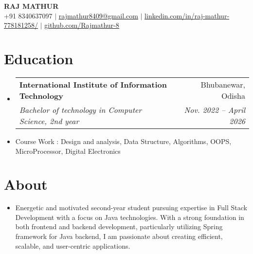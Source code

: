 \documentclass[letterpaper,11pt]{article}
\makeatletter
\newcommand{\resumeItem}[1]{
  \item\small{
    {#1 \vspace{-2pt}}
  }
}
\newcommand{\resumeSubheading}[4]{
  \vspace{-2pt}\item
    \begin{tabular*}{0.97\textwidth}[t]{l@{\extracolsep{\fill}}r}
      \textbf{#1} & #2 \\
      \textit{\small#3} & \textit{\small #4} \\
    \end{tabular*}\vspace{-7pt}
}
\newcommand{\resumeSubHeadingListStart}{\begin{itemize}[leftmargin=0.15in, label={}]}
\newcommand{\resumeSubHeadingListEnd}{\end{itemize}}
\makeatother
\begin{document}

\begin{center}
    \textbf{\Huge \scshape RAJ MATHUR} \\ \vspace{1pt}
    \small +91 8340637097 $|$ \href{mailto:x@x.com}{\underline{rajmathur8409@gmail.com}} $|$ 
    \href{https://linkedin.com/in/...}{\underline{linkedin.com/in/raj-mathur-778181258/}} $|$
    \href{https://github.com/...}{\underline{github.com/Rajmathur-8}}
\end{center}


\section{Education}
  \resumeSubHeadingListStart
    \resumeSubheading
      {International Institute of Information Technology}{Bhubanewar, Odisha}
      {Bachelor of technology in Computer Science, 2nd year}{Nov. 2022 -- April 2026}
      \resumeItem{Course Work : Design and analysis, Data Structure, Algorithms, OOPS, MicroProcessor, Digital Electronics}
  \resumeSubHeadingListEnd

\section{About}
  \resumeSubHeadingListStart
      \resumeItem{Energetic and motivated second-year student pursuing expertise in Full Stack Development with a focus on Java technologies. With a strong foundation in both frontend and backend development, particularly utilizing Spring framework for Java backend, I am passionate about creating efficient, scalable, and user-centric applications. }
  \resumeSubHeadingListEnd


      
\end{document}
